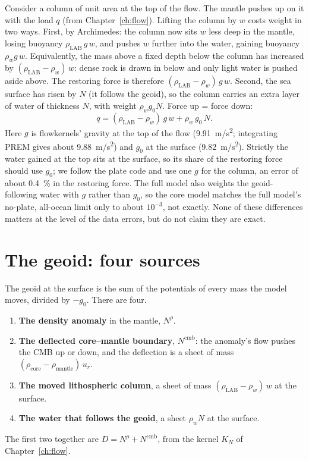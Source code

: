 Consider a column of unit area at the top of the flow.
The mantle pushes up on it with the load $q$ (from Chapter~\ref{ch:flow}).
Lifting the column by $w$ costs weight in two ways.
First, by Archimedes: the column now sits $w$ less deep in the mantle, losing buoyancy $\rho_{\mathrm{LAB}}\,g\,w$, and pushes $w$ further into the water, gaining buoyancy $\rho_w g\,w$.
Equivalently, the mass above a fixed depth below the column has increased by $(\rho_{\mathrm{LAB}}-\rho_w)\,w$: dense rock is drawn in below and only light water is pushed aside above.
The restoring force is therefore $(\rho_{\mathrm{LAB}}-\rho_w)\,g\,w$.
Second, the sea surface has risen by $N$ (it follows the geoid), so the column carries an extra layer of water of thickness $N$, with weight $\rho_w g_0 N$.
Force up = force down:
\begin{equation}
    q = (\rho_{\mathrm{LAB}}-\rho_w)\,g\,w + \rho_w\,g_0\,N .
    \label{eq:c-force}
\end{equation}
Here $g$ is flowkernels' gravity at the top of the flow (\qty{9.91}{m/s^2}; integrating PREM gives about \qty{9.88}{m/s^2}) and $g_0$ at the surface (\qty{9.82}{m/s^2}).
Strictly the water gained at the top sits at the surface, so its share of the restoring force should use $g_0$; we follow the plate code and use one $g$ for the column, an error of about \qty{0.4}{\percent} in the restoring force.
The full model also weights the geoid-following water with $g$ rather than $g_0$, so the core model matches the full model's no-plate, all-ocean limit only to about $10^{-3}$, not exactly.
None of these differences matters at the level of the data errors, but do not claim they are exact.

\section{The geoid: four sources}

The geoid at the surface is the sum of the potentials of every mass the model moves, divided by $-g_0$.
There are four.
\begin{enumerate}[nosep]
\item \textbf{The density anomaly} in the mantle, $N^{\rho}$.
\item \textbf{The deflected core--mantle boundary}, $N^{\mathrm{cmb}}$: the anomaly's flow pushes the CMB up or down, and the deflection is a sheet of mass $(\rho_{\mathrm{core}}-\rho_{\mathrm{mantle}})\,u_r$.
\item \textbf{The moved lithospheric column}, a sheet of mass $(\rho_{\mathrm{LAB}}-\rho_w)\,w$ at the surface.
\item \textbf{The water that follows the geoid}, a sheet $\rho_w N$ at the surface.
\end{enumerate}
The first two together are $D = N^{\rho}+N^{\mathrm{cmb}}$, from the kernel $K_N$ of Chapter~\ref{ch:flow}.

